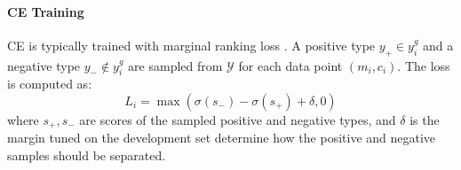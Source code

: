 \paragraph{CE Training} CE is typically trained with marginal ranking loss \cite{lite}. A positive type $y_+ \in y^g_i$ and a negative type $y_{-} \not \in y^g_i$ are sampled from $\mathcal{Y}$ for each data point $(m_i, c_i)$. The loss is computed as:
$$ L_i = \max(\sigma(s_{-}) - \sigma(s_{+}) + \delta, 0) $$ where $s_{+}, s_{-}$ are scores of the sampled positive and negative types, and $\delta$ is the margin tuned on the development set determine how the positive and negative samples should be separated.